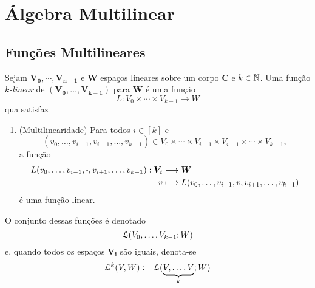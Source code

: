 \chapter{Álgebra Multilinear}

\section{Funções Multilineares}

\begin{defi}
Sejam $\bm{V_0},\cdots,\bm{V_{n-1}}$ e $\bm W$ espaços lineares sobre um corpo $\bm C$ e $k \in \mathbb{N}$. Uma função \emph{$k$-linear} de $(\bm{V_0},\ldots,\bm{V_{k-1}})$ para $\bm W$ é uma função
	\begin{equation*}
	L\colon V_0 \times \cdots \times V_{k-1} \to W
	\end{equation*}
qua satisfaz
	\begin{enumerate}
	\item (Multilinearidade) Para todos $i \in [k]$ e
	\begin{equation*}
	(v_0,\ldots,v_{i-1},v_{i+1},\ldots,v_{k-1}) \in V_0 \times \cdots \times V_{i-1} \times V_{i+1} \times \cdots \times V_{k-1},
	\end{equation*}
a função
	\begin{align*}
	{L(v_0,\ldots,v_{i-1},\bm{\cdot},v_{i+1},\ldots,v_{k-1})}: {\bm{V_i}} &\longrightarrow {\bm W} \\{v} &\longmapsto {L(v_0,\ldots,v_{i-1},v,v_{i+1},\ldots,v_{k-1})}
	\end{align*}
é uma função linear.
	\end{enumerate}
O conjunto dessas funções é denotado
	\begin{equation*}
	\mathcal{L}(V_0,\ldots,V_{k-1};W)
	\end{equation*}
e, quando todos os espaços $\bm{V_i}$ são iguais, denota-se
	\begin{equation*}
	\mathcal{L}^k(V,W) := \mathcal{L}(\underbrace{V,\ldots,V}_k;W)
	\end{equation*}
\end{defi}

